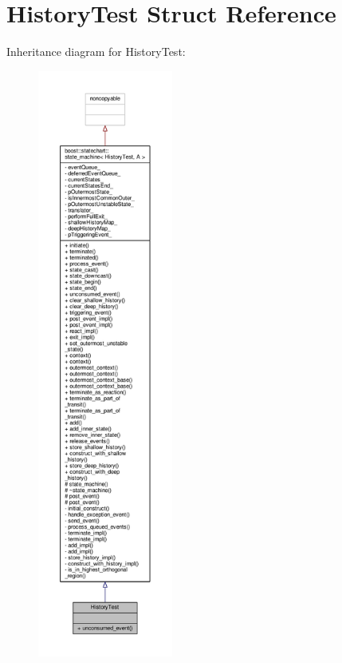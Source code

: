 \hypertarget{struct_history_test}{}\section{History\+Test Struct Reference}
\label{struct_history_test}


Inheritance diagram for History\+Test\+:
\nopagebreak
\begin{figure}[H]
\begin{center}
\leavevmode
\includegraphics[height=550pt]{struct_history_test__inherit__graph}
\end{center}
\end{figure}


